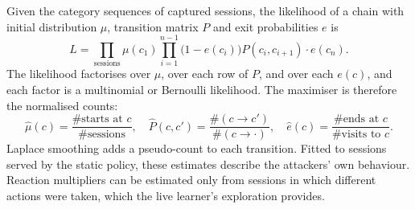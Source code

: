 Given the category sequences of captured sessions, the likelihood of a chain with initial
distribution $\mu$, transition matrix $P$ and exit probabilities $e$ is
\[
L = \prod_{\text{sessions}} \mu(c_1) \prod_{i=1}^{n-1} \big(1-e(c_i)\big) P(c_i, c_{i+1}) \cdot e(c_n).
\]
The likelihood factorises over $\mu$, over each row of $P$, and over each $e(c)$, and each factor
is a multinomial or Bernoulli likelihood. The maximiser is therefore the normalised counts:
\[
\hat\mu(c) = \frac{\#\text{starts at } c}{\#\text{sessions}}, \quad
\hat P(c,c') = \frac{\#(c \to c')}{\#(c \to \cdot)}, \quad
\hat e(c) = \frac{\#\text{ends at } c}{\#\text{visits to } c}.
\]
Laplace smoothing adds a pseudo-count to each transition. Fitted to sessions served by the
static policy, these estimates describe the attackers' own behaviour. Reaction multipliers can
be estimated only from sessions in which different actions were taken, which the live learner's
exploration provides.
